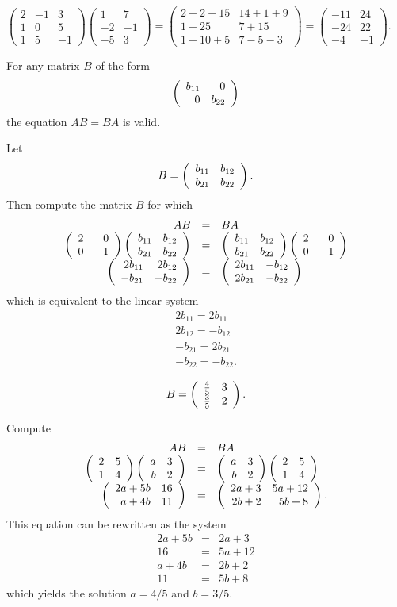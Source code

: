 $\left(\begin{array}{rrr} 2 &  -1 &3\\ 1 & 0 & 5 \\1 & 5 & -1
\end{array}\right)
\left(\begin{array}{rrr} 1 & 7 \\ -2 & -1 \\ -5 & 3\end{array}\right)
= \left(\begin{array}{cc} 2+2-15 & 14+1+9 \\ 1-25 & 7+15 \\
1-10+5 & 7-5-3 \end{array}\right)
= \left(\begin{array}{rr} -11 & 24 \\ -24 & 22 \\ -4 & -1
\end{array}\right)$.


\ans For any matrix $B$ of the form
\[
\left(\begin{array}{rr} b_{11} & 0\\ 0 &b_{22}\end{array}\right)
\]
the equation $AB = BA$ is valid.

\soln Let
\[
B = \left(\begin{array}{rr} b_{11} & b_{12}\\ b_{21} &b_{22}\end{array}\right).
\]
Then compute the matrix $B$ for which
\[
\begin{array}{rcl}
AB & = & BA \\
\left(\begin{array}{rr} 2 & 0\\ 0 &-1\end{array}\right)\left(\begin{array}{rr} b_{11} & b_{12}\\ b_{21} &b_{22}\end{array}\right) &
= & \left(\begin{array}{rr} b_{11} & b_{12}\\ b_{21} &b_{22}\end{array}\right)\left(\begin{array}{rr} 2 & 0\\ 0 &-1\end{array}\right) \\
\left(\begin{array}{rr} 2b_{11} & 2b_{12}\\ -b_{21} &-b_{22}\end{array}\right) & = &
\left(\begin{array}{rr} 2b_{11} & -b_{12}\\ 2b_{21} &-b_{22}\end{array}\right) \end{array}
\]
which is equivalent to the linear system
\[
\begin{array}{l}
2b_{11} = 2b_{11} \\
2b_{12} = -b_{12} \\
-b_{21} = 2b_{21} \\
-b_{22} = -b_{22}. \end{array}
\]

\ans 
\[
B = \left(\begin{array}{rr} \frac{4}{5} & 3\\ \frac{3}{5} &2\end{array}\right).
\]

\soln Compute
\[
\begin{array}{rcl}
AB & = & BA \\
\left(\begin{array}{rr} 2 & 5\\ 1 &4\end{array}\right)\left(\begin{array}{rr} a & 3\\ b &2\end{array}\right) & = &
\left(\begin{array}{rr} a & 3\\ b &2\end{array}\right)\left(\begin{array}{rr} 2 & 5\\ 1 &4\end{array}\right) \\
\left(\begin{array}{rr} 2a+5b & 16\\ a+4b &11\end{array}\right) & = & \left(\begin{array}{rr} 2a+3 & 5a+12\\ 2b+2 &5b+8\end{array}\right).
\end{array}
\]
This equation can be rewritten as the system
\[
\begin{array}{rcl}
2a + 5b & = & 2a + 3 \\
16 & = & 5a + 12 \\
a + 4b & = & 2b + 2 \\
11 & = & 5b + 8 \end{array}
\]
which yields the solution $a = 4/5$ and $b = 3/5$.

